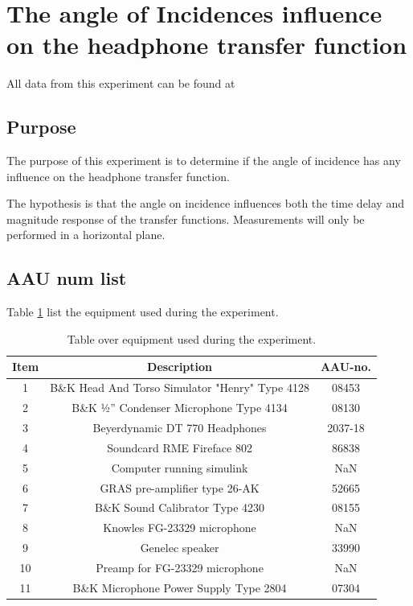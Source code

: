 
\section{The angle of Incidences influence on the headphone transfer function} \label{sec:AngleOfIncidence}

All data from this experiment can be found at

\subsection{Purpose}
The purpose of this experiment is to determine if the angle of incidence has any influence on the headphone transfer function. 

The hypothesis is that the angle on incidence influences both the time delay and magnitude response of the transfer functions. Measurements will only be performed in a horizontal plane. 

\subsection{AAU num list}

Table \ref{tab:AngleOfIncideceHP} list the equipment used during the experiment.

\begin{table}[H]
	\centering
	\begin{tabular}{ c c c } \toprule
		{Item}	& {Description} 						& {AAU-no}. \\ \bottomrule 
		1	&	B\&K Head And Torso Simulator "Henry" Type 4128	& 08453	\\
		2	&	B\&K ½'' Condenser Microphone Type 4134 	& 08130		\\
		3	&	Beyerdynamic DT 770 Headphones				& 2037-18		\\
		4	&	Soundcard RME Fireface 802					& 86838		\\
		5	&	Computer running simulink		& NaN		\\
		6	&	GRAS pre-amplifier type 26-AK			& 52665		\\
		7	&	B\&K Sound Calibrator Type 4230				& 08155		\\ 
		8	&	Knowles FG-23329 microphone					& NaN		\\
		9	&	Genelec speaker								& 33990		\\ 
		10	&	Preamp for FG-23329  microphone	& NaN\\
		11	& 	B\&K Microphone Power Supply Type 2804		& 07304		\\
		\bottomrule
	\end{tabular}
	\caption{Table over equipment used during the experiment.}
	\label{tab:AngleOfIncideceHP}
\end{table}

